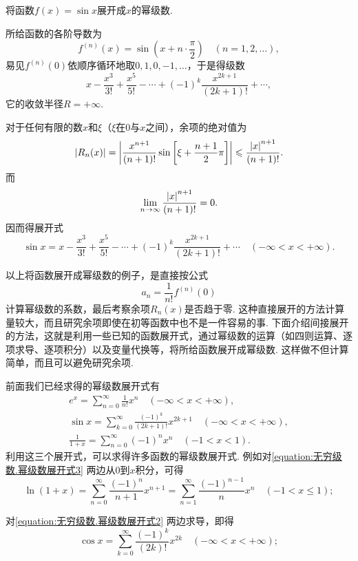 \begin{example}
将函数\(f(x) = \sin x\)展开成\(x\)的幂级数.
\begin{solution}
所给函数的各阶导数为\[
f^{(n)}(x) = \sin\left(x + n\cdot\frac{\pi}{2}\right)
\quad(n=1,2,\dotsc),
\]易见\(f^{(n)}(0)\)依顺序循环地取\(0,1,0,-1,\dotsc\)，于是得级数\[
x-\frac{x^3}{3!}+\frac{x^5}{5!}-\dotsb+(-1)^k \frac{x^{2k+1}}{(2k+1)!}+\dotsb,
\]它的收敛半径\(R=+\infty\).

对于任何有限的数\(x\)和\(\xi\)（\(\xi\)在\(0\)与\(x\)之间），余项的绝对值为\[
\abs{R_n(x)}
= \abs{ \frac{x^{n+1}}{(n+1)!} \sin\left[\xi+\frac{n+1}{2}\pi\right] }
\leqslant \frac{\abs{x}^{n+1}}{(n+1)!}.
\]而\[
\lim\limits_{n\to\infty} \frac{\abs{x}^{n+1}}{(n+1)!} = 0.
\]因而得展开式\[
\sin x = x-\frac{x^3}{3!}+\frac{x^5}{5!}-\dotsb+(-1)^k \frac{x^{2k+1}}{(2k+1)!}+\dotsb
\quad(-\infty<x<+\infty).
\]
\end{solution}
\end{example}

以上将函数展开成幂级数的例子，是直接按公式\[
a_n = \frac{1}{n!} f^{(n)}(0)
\]计算幂级数的系数，最后考察余项\(R_n(x)\)是否趋于零.
这种直接展开的方法计算量较大，而且研究余项即使在初等函数中也不是一件容易的事.
下面介绍间接展开的方法，这就是利用一些已知的函数展开式，通过幂级数的运算（如四则运算、逐项求导、逐项积分）以及变量代换等，将所给函数展开成幂级数.
这样做不但计算简单，而且可以避免研究余项.

前面我们已经求得的幂级数展开式有\begin{gather}
e^x = \sum\limits_{n=0}^\infty \frac{1}{n!} x^n
	\quad(-\infty<x<+\infty), \label{equation:无穷级数.幂级数展开式1} \\
\sin x = \sum\limits_{k=0}^\infty \frac{(-1)^k}{(2k+1)!} x^{2k+1}
	\quad(-\infty<x<+\infty), \label{equation:无穷级数.幂级数展开式2} \\
\frac{1}{1+x} = \sum\limits_{n=0}^\infty (-1)^n x^n
	\quad(-1<x<1). \label{equation:无穷级数.幂级数展开式3}
\end{gather}
利用这三个展开式，可以求得许多函数的幂级数展开式.
例如对\cref{equation:无穷级数.幂级数展开式3} 两边从\(0\)到\(x\)积分，可得
\begin{equation}\label{equation:无穷级数.幂级数展开式4}
\ln(1+x) = \sum\limits_{n=0}^\infty \frac{(-1)^n}{n+1} x^{n+1}
= \sum\limits_{n=1}^\infty \frac{(-1)^{n-1}}{n} x^n
\quad(-1<x\leqslant1);
\end{equation}

对\cref{equation:无穷级数.幂级数展开式2} 两边求导，即得
\begin{equation}\label{equation:无穷级数.幂级数展开式5}
\cos x = \sum\limits_{k=0}^\infty \frac{(-1)^k}{(2k)!} x^{2k}
\quad(-\infty<x<+\infty);
\end{equation}

